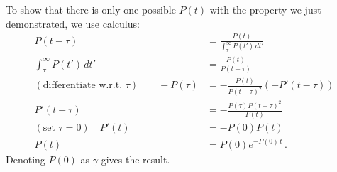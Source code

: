 To show that there is only one possible $P(t)$ with the property we just demonstrated, we use calculus:
\begin{align*}
  P(t - \tau) &= \frac{P(t)}{\int_\tau^\infty P(t') \, dt'} \\
  \int_\tau^\infty P(t') \, dt' &= \frac{P(t)}{P(t - \tau)} \\
  (\text{differentiate w.r.t. }\tau) \qquad -P(\tau) &= -\frac{P(t)}{P(t - \tau)^2}
  \left( - P'(t-\tau) \right) \\
  P'(t - \tau) &= - \frac{P(\tau)P(t - \tau)^2}{P(t)} \\
  (\text{set }\tau=0) \quad P'(t) &= - P(0)P(t) \\
  P(t) &= P(0) e^{-P(0) \, t} \, .
\end{align*}
Denoting $P(0)$ as $\gamma$ gives the result.
